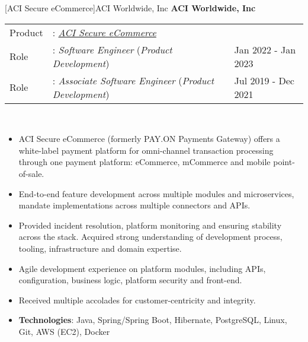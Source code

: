 \documentclass[a4paper]{article}
\begin{document}
[ACI Secure eCommerce]{ACI Worldwide, Inc}
\textbf{ACI Worldwide, Inc} \\
\noindent
\begin{tabularx}{\textwidth}{ l l>{\raggedleft\arraybackslash}X}
	Product & : \textit{\href{https://www.aciworldwide.com/solutions/aci-secure-ecommerce}{ACI Secure eCommerce}} &                     \\
	Role    & : \textit{Software Engineer} (\textit{Product Development})                                         & Jan 2022 - Jan 2023 \\
	Role    & : \textit{Associate Software Engineer} (\textit{Product Development})                               & Jul 2019 - Dec 2021 \\
\end{tabularx}
\textbf{} \\
\begin{itemize} \itemsep 1pt
	\item ACI Secure eCommerce (formerly PAY.ON Payments Gateway) offers a white-label payment platform for omni-channel transaction processing through one payment platform: eCommerce, mCommerce and mobile point-of-sale.
	\item End-to-end feature development across multiple modules and microservices, mandate implementations across multiple connectors and APIs.
	\item Provided incident resolution, platform monitoring and ensuring stability across the stack. Acquired strong understanding of development process, tooling, infrastructure and domain expertise.
	\item Agile development experience on platform modules, including APIs, configuration, business logic, platform security and front-end.
	\item Received multiple accolades for customer-centricity and integrity.
	\item \textbf{Technologies}: Java, Spring/Spring Boot, Hibernate, PostgreSQL, Linux, Git, AWS (EC2), Docker
\end{itemize}

\end{document}
